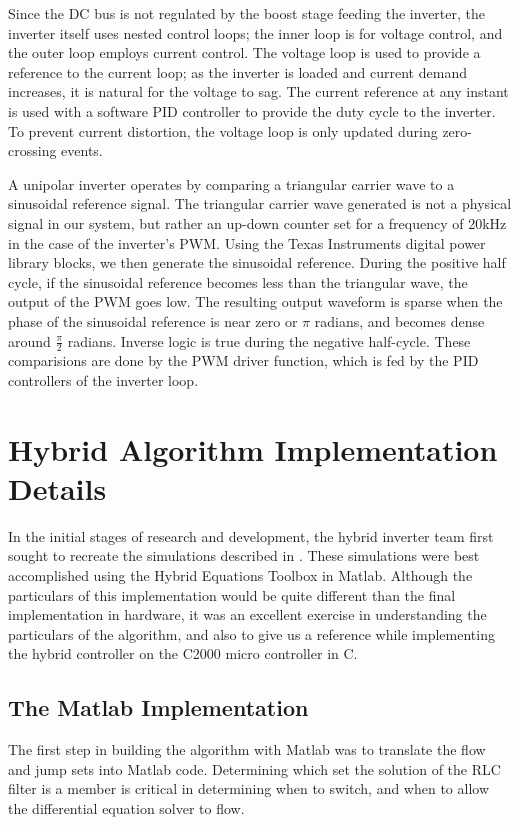 Since the DC bus is not regulated by the boost stage feeding the inverter, the inverter itself uses nested control loops; the inner loop is for voltage control, and the outer loop employs current control. The voltage loop is used to provide a reference to the current loop; as the inverter is loaded and current demand increases, it is natural for the voltage to sag. The current reference at any instant is used with a software PID controller to provide the duty cycle to the inverter. To prevent current distortion, the voltage loop is only updated during zero-crossing events.

A unipolar inverter operates by comparing a triangular carrier wave to a sinusoidal reference signal. The triangular carrier wave generated is not a physical signal in our system, but rather an up-down counter set for a frequency of 20kHz in the case of the inverter's PWM. Using the Texas Instruments digital power library blocks, we then generate the sinusoidal reference. During the positive half cycle, if the sinusoidal reference becomes less than the triangular wave, the output of the PWM goes low. The resulting output waveform is sparse when the phase of the sinusoidal reference is near zero or $\pi$ radians, and becomes dense around $\frac{\pi}{2}$ radians. Inverse logic is true during the negative half-cycle. These comparisions are done by the PWM driver function, which is fed by the PID controllers of the inverter loop.

\section{Hybrid Algorithm Implementation Details}
In the initial stages of research and development, the hybrid inverter team first sought to recreate the simulations described in \cite{ricardo}. These simulations were best accomplished using the Hybrid Equations Toolbox in Matlab. Although the particulars of this implementation would be quite different than the final implementation in hardware, it was an excellent exercise in understanding the particulars of the algorithm, and also to give us a reference while implementing the hybrid controller on the C2000 micro controller in C. 

\subsection{The Matlab Implementation}
The first step in building the algorithm with Matlab was to translate the flow and jump sets into Matlab code. Determining which set the solution of the RLC filter is a member is critical in determining when to switch, and when to allow the differential equation solver to flow. 

